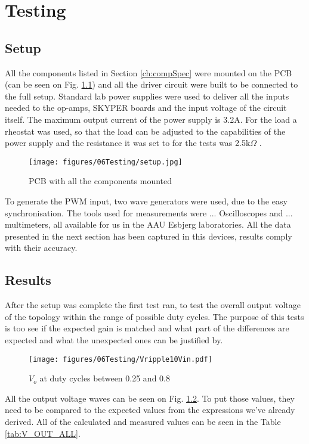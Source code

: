\chapter{Testing}\label{ch:testing}

\section{Setup}
All the components listed in Section \ref{ch:compSpec} were mounted on the PCB (can be seen on Fig. \ref{fig:SETUP}) and all the driver circuit were built to be connected to the full setup.
Standard lab power supplies were used to deliver all the inputs needed to the op-amps, SKYPER boards and the input voltage of the circuit itself. 
The maximum output current of the power supply is 3.2A.
For the load a rheostat was used, so that the load can be adjusted to the capabilities of the power supply and the resistance it was set to for the tests was 2.5k$\Omega$ . 

\begin{figure}[H]
	\begin{center}
   \texttt{[image: figures/06Testing/setup.jpg]}
	\end{center}
	\vspace{-4mm}
	\caption{PCB with all the components mounted}
	\label{fig:SETUP}
\end{figure}

To generate the PWM input, two wave generators were used, due to the easy synchronisation. The tools used for measurements were ... Oscilloscopes and ... multimeters, all available for us in the AAU Esbjerg laboratories. All the data presented in the next section has been captured in this devices, results comply with their accuracy.
\clearpage
\vspace{-6mm}
\section{Results}

After the setup was complete the first test ran, to test the overall output voltage of the topology within the range of possible duty cycles. The purpose of this tests is too see if the expected gain is matched and what part of the differences are expected and what the unexpected ones can be justified by. 
\vspace{-4mm}

\begin{figure}[H]
	\begin{center}
   \texttt{[image: figures/06Testing/Vripple10Vin.pdf]}
	\end{center}
	\vspace{-8mm}
	\caption{$V_o$ at duty cycles between 0.25 and 0.8}
	\label{fig:V_OUT_ALL}
\end{figure}
\vspace{-4mm}
All the output voltage waves can be seen on Fig. \ref{fig:V_OUT_ALL}. To put those values, they need to be compared to the expected values from the expressions we've already derived. All of the calculated and measured values can be seen in the Table \ref{tab:V_OUT_ALL}.
\vspace{-2mm}

